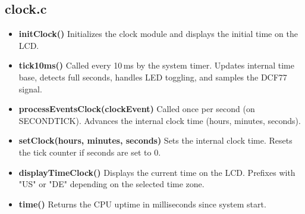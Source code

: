 \documentclass[a4paper,12pt]{article}
\begin{document}

\subsection{clock.c}
\begin{itemize}
    \item \textbf{initClock()}  
    Initializes the clock module and displays the initial time on the LCD.

    \item \textbf{tick10ms()}  
    Called every 10\,ms by the system timer. Updates internal time base, detects full seconds, handles LED toggling, and samples the DCF77 signal.

    \item \textbf{processEventsClock(clockEvent)}  
    Called once per second (on SECONDTICK). Advances the internal clock time (hours, minutes, seconds).

    \item \textbf{setClock(hours, minutes, seconds)}  
    Sets the internal clock time. Resets the tick counter if seconds are set to 0.

    \item \textbf{displayTimeClock()}  
    Displays the current time on the LCD. Prefixes with "US" or "DE" depending on the selected time zone.

    \item \textbf{time()}  
    Returns the CPU uptime in milliseconds since system start.
\end{itemize}



\end{document}
